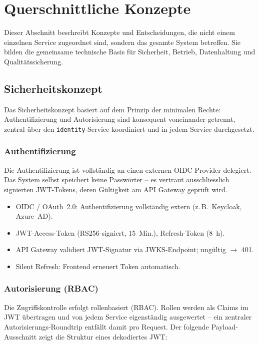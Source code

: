 \section{Querschnittliche Konzepte}

Dieser Abschnitt beschreibt Konzepte und Entscheidungen, die nicht einem einzelnen
Service zugeordnet sind, sondern das gesamte System betreffen. Sie bilden die
gemeinsame technische Basis für Sicherheit, Betrieb, Datenhaltung und Qualitätssicherung.

\subsection{Sicherheitskonzept}

Das Sicherheitskonzept basiert auf dem Prinzip der minimalen Rechte: Authentifizierung
und Autorisierung sind konsequent voneinander getrennt, zentral über den
\texttt{identity}-Service koordiniert und in jedem Service durchgesetzt.

\subsubsection{Authentifizierung}

Die Authentifizierung ist vollständig an einen externen OIDC-Provider delegiert.
Das System selbst speichert keine Passwörter -- es vertraut ausschliesslich
signierten JWT-Tokens, deren Gültigkeit am API Gateway geprüft wird.

\begin{itemize}[leftmargin=1.5em]
  \item OIDC / OAuth~2.0: Authentifizierung vollständig extern (z.\,B.\ Keycloak, Azure~AD).
  \item JWT-Access-Token (RS256-signiert, 15~Min.), Refresh-Token (8~h).
  \item API Gateway validiert JWT-Signatur via JWKS-Endpoint; ungültig $\to$ 401.
  \item Silent Refresh: Frontend erneuert Token automatisch.
\end{itemize}

\subsubsection{Autorisierung (RBAC)}

Die Zugriffskontrolle erfolgt rollenbasiert (RBAC). Rollen werden als Claims im
JWT übertragen und von jedem Service eigenständig ausgewertet -- ein zentraler
Autorisierungs-Roundtrip entfällt damit pro Request. Der folgende
Payload-Ausschnitt zeigt die Struktur eines dekodiertes JWT:

